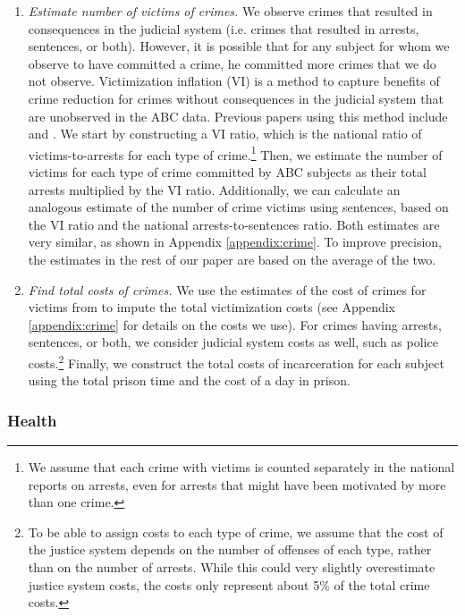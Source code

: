 \begin{enumerate}
\item \textit{Estimate number of victims of crimes.} We observe crimes that resulted in consequences in the judicial system (i.e. crimes that resulted in arrests, sentences, or both). However, it is possible that for any subject for whom we observe to have committed a crime, he committed more crimes that we do not observe. Victimization inflation (VI) is a method to capture benefits of crime reduction for crimes without consequences in the judicial system that are unobserved in the ABC data. Previous papers using this method include \citet{Belfield_Nores_etal_2006_JHR} and \cite{Heckman_Moon_etal_2010_RateofReturn}. We start by constructing a VI ratio, which is the national ratio of victims-to-arrests for each type of crime.\footnote{We assume that each crime with victims is counted separately in the national reports on arrests, even for arrests that might have been motivated by more than one crime.} Then, we estimate the number of victims for each type of crime committed by ABC subjects as their total arrests multiplied by the VI ratio. Additionally, we can calculate an analogous estimate of the number of crime victims using sentences, based on the VI ratio and the national arrests-to-sentences ratio. Both estimates are very similar, as shown in Appendix \ref{appendix:crime}. To improve precision, the estimates in the rest of our paper are based on the average of the two.

\item \textit{Find total costs of crimes.} We use the estimates of the cost of crimes for victims from \cite{McCollister_etal_2010_DAD} to impute the total victimization costs (see Appendix \ref{appendix:crime} for details on the costs we use). For crimes having arrests, sentences, or both, we consider judicial system costs as well, such as police costs.\footnote{To be able to assign costs to each type of crime, we assume that the cost of the justice system depends on the number of offenses of each type, rather than on the number of arrests. While this could very slightly overestimate justice system costs, the costs only represent about 5\% of the total crime costs.} Finally, we construct the total costs of incarceration for each subject using the total prison time and the cost of a day in prison.
\end{enumerate}

\subsubsection{Health} \label{section:health}

